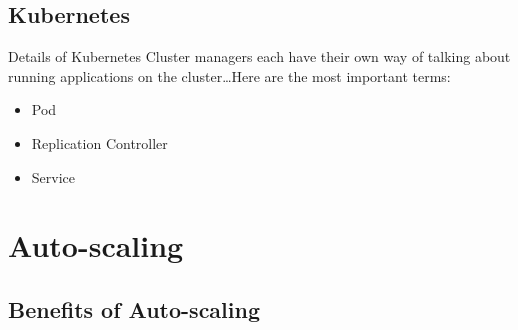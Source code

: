 \documentclass{beamer}
\begin{document}
\subsection{Kubernetes}

\begin{frame}{Details of Kubernetes}
  Cluster managers each have their own way of talking about running applications
  on the cluster\ldots Here are the most important terms:


  \begin{itemize}
    \item Pod
    \item Replication Controller
    \item Service
  \end{itemize}
\end{frame}

\section{Auto-scaling}

\subsection{Benefits of Auto-scaling}
\end{document}
